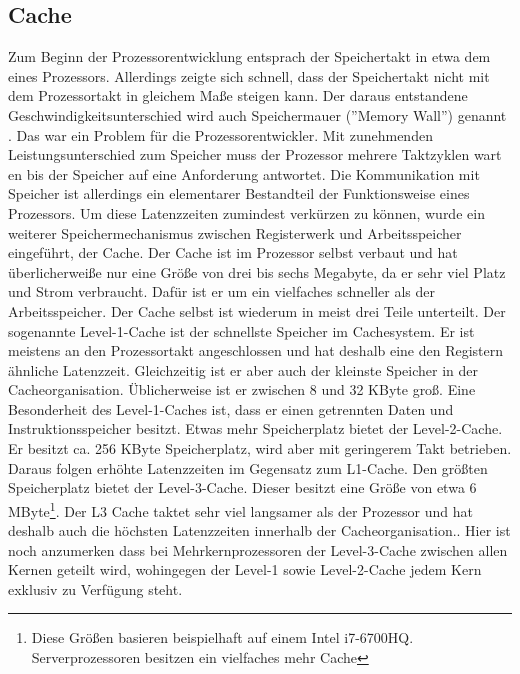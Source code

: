 \documentclass[12pt]{article}
\begin{document}
\subsection{Cache} \label{subsec:cache}
Zum Beginn der Prozessorentwicklung entsprach der Speichertakt in etwa dem eines Prozessors. Allerdings zeigte sich schnell, dass der Speichertakt nicht mit dem Prozessortakt in gleichem Maße steigen kann. Der daraus entstandene Geschwindigkeitsunterschied wird auch Speichermauer (''Memory Wall'') genannt \cite{mckee2004reflections}.
Das war ein Problem für die Prozessorentwickler. Mit zunehmenden Leistungsunterschied zum Speicher muss der Prozessor mehrere Taktzyklen wart%
en bis der Speicher auf eine Anforderung antwortet. Die Kommunikation mit Speicher ist allerdings ein elementarer Bestandteil der Funktionsweise eines Prozessors. Um diese Latenzzeiten zumindest verkürzen zu können, wurde ein weiterer Speichermechanismus zwischen Registerwerk und Arbeitsspeicher eingeführt, der Cache. Der Cache ist im Prozessor selbst verbaut und hat überlicherweiße nur eine Größe von drei bis sechs Megabyte, da er sehr viel Platz und Strom verbraucht. Dafür ist er um ein vielfaches schneller als der Arbeitsspeicher. Der Cache selbst ist wiederum in meist drei Teile unterteilt. Der sogenannte Level-1-Cache ist der schnellste Speicher im Cachesystem. Er ist meistens an den Prozessortakt angeschlossen und hat deshalb eine den Registern ähnliche Latenzzeit. Gleichzeitig ist er aber auch der kleinste Speicher in der Cacheorganisation. 
Üblicherweise ist er zwischen 8 und 32 KByte groß. Eine Besonderheit des Level-1-Caches ist, dass er  einen getrennten Daten und Instruktionsspeicher besitzt. Etwas mehr Speicherplatz bietet der Level-2-Cache. Er besitzt ca. 256 KByte Speicherplatz, wird aber mit geringerem Takt betrieben. Daraus folgen erhöhte Latenzzeiten im Gegensatz zum L1-Cache. Den größten Speicherplatz bietet der Level-3-Cache. Dieser besitzt eine Größe von etwa 6 MByte\footnote{Diese Größen basieren beispielhaft auf einem Intel i7-6700HQ. Serverprozessoren besitzen ein vielfaches mehr Cache}. Der L3 Cache taktet sehr viel langsamer als der Prozessor und hat deshalb auch die höchsten Latenzzeiten innerhalb der Cacheorganisation.\cite{molka2009memory}. Hier ist noch anzumerken dass bei Mehrkernprozessoren der Level-3-Cache zwischen allen Kernen geteilt wird, wohingegen der Level-1 sowie Level-2-Cache jedem Kern exklusiv zu Verfügung steht.
\end{document}
